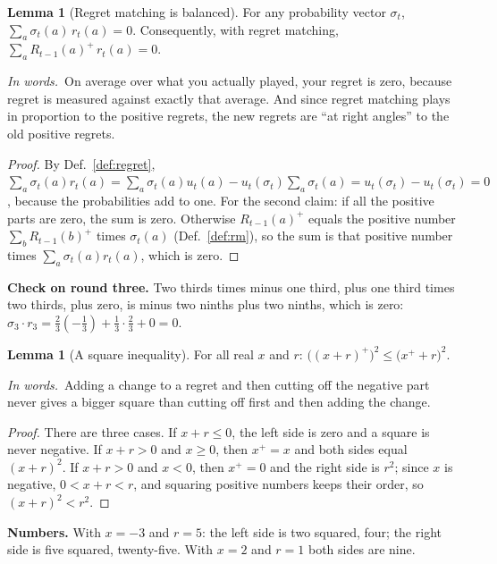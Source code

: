 \documentclass[11pt]{article}
\theoremstyle{definition}
\newtheorem{lemma}[definition]{Lemma}
\newcommand{\inwords}{\par\smallskip\noindent\textit{In words.}\ }
\newcommand{\Def}[1]{Def.~\ref{#1}}\newcommand{\Lem}[1]{Lemma~\ref{#1}}\newcommand{\Thm}[1]{Thm.~\ref{#1}}
\begin{document}
\begin{lemma}[Regret matching is balanced]\label{lem:orth}
For any probability vector $\sigma_t$, $\sum_a\sigma_t(a)\,r_t(a)=0$. Consequently, with regret matching,
$\sum_aR_{t-1}(a)^+\,r_t(a)=0$.
\inwords On average over what you actually played, your regret is zero, because regret is measured against exactly that
average. And since regret matching plays in proportion to the positive regrets, the new regrets are ``at right angles''
to the old positive regrets.
\end{lemma}
\begin{proof}
By \Def{def:regret}, $\sum_a\sigma_t(a)r_t(a)=\sum_a\sigma_t(a)u_t(a)-u_t(\sigma_t)\sum_a\sigma_t(a)=u_t(\sigma_t)-u_t(\sigma_t)=0$,
because the probabilities add to one. For the second claim: if all the positive parts are zero, the sum is zero.
Otherwise $R_{t-1}(a)^+$ equals the positive number $\sum_bR_{t-1}(b)^+$ times $\sigma_t(a)$ (\Def{def:rm}), so the sum is
that positive number times $\sum_a\sigma_t(a)r_t(a)$, which is zero.
\end{proof}
\textbf{Check on round three.} Two thirds times minus one third, plus one third times two thirds, plus zero, is minus two
ninths plus two ninths, which is zero: $\sigma_3\cdot r_3=\tfrac23(-\tfrac13)+\tfrac13\cdot\tfrac23+0=0$.

\begin{lemma}[A square inequality]\label{lem:sq}
For all real $x$ and $r$: $\big((x+r)^+\big)^2\le\big(x^++r\big)^2$.
\inwords Adding a change to a regret and then cutting off the negative part never gives a bigger square than cutting off
first and then adding the change.
\end{lemma}
\begin{proof}
There are three cases. If $x+r\le0$, the left side is zero and a square is never negative. If $x+r>0$ and $x\ge0$, then
$x^+=x$ and both sides equal $(x+r)^2$. If $x+r>0$ and $x<0$, then $x^+=0$ and the right side is $r^2$; since $x$ is
negative, $0<x+r<r$, and squaring positive numbers keeps their order, so $(x+r)^2<r^2$.
\end{proof}
\textbf{Numbers.} With $x=-3$ and $r=5$: the left side is two squared, four; the right side is five squared, twenty-five.
With $x=2$ and $r=1$ both sides are nine.
\end{document}
